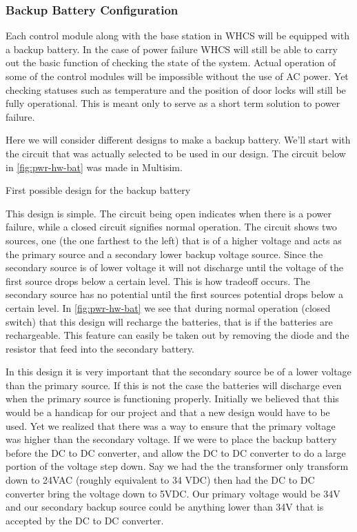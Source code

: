 \subsubsection{Backup Battery Configuration}
Each control module along with the base station in WHCS will be equipped with a
backup battery. In the case of power failure WHCS will still be able to carry
out the basic function of checking the state of the system. Actual operation of
some of the control modules will be impossible without the use of AC power. Yet
checking statuses such as temperature and the position of door locks will still
be fully operational. This is meant only to serve as a short term solution to
power failure.

Here we will consider different designs to make a backup battery. We{}'ll start
with the circuit that was actually selected to be used in our design. The
circuit below in \autoref{fig:pwr-hw-bat} was made in Multisim.
\cite{link4}

{First possible design for the backup battery}

This design is simple. The circuit being open indicates when there is a power
failure, while a closed circuit signifies normal operation. The circuit shows
two sources, one (the one farthest to the left) that is of a higher voltage and
acts as the primary source and a secondary lower backup voltage source. Since
the secondary source is of lower voltage it will not discharge until the
voltage of the first source drops below a certain level. This is how tradeoff
occurs.  The secondary source has no potential until the first sources
potential drops below a certain level. In \autoref{fig:pwr-hw-bat} we see that
during normal operation (closed switch) that this design will recharge the
batteries, that is if the batteries are rechargeable. This feature can easily
be taken out by removing the diode and the resistor that feed into the
secondary battery.

In this design it is very important that the secondary source be of a lower
voltage than the primary source. If this is not the case the batteries will
discharge even when the primary source is functioning properly. Initially we
believed that this would be a handicap for our project and that a new design
would have to be used. Yet we realized that there was a way to ensure that the
primary voltage was higher than the secondary voltage. If we were to place the
backup battery before the DC to DC converter, and allow the DC to DC converter
to do a large portion of the voltage step down.  Say we had the the transformer
only transform down to 24VAC (roughly equivalent to 34 VDC) then had the DC to
DC converter bring the voltage down to 5VDC. Our primary voltage would be 34V
and our secondary backup source could be anything lower than 34V that is
accepted by the DC to DC converter.


